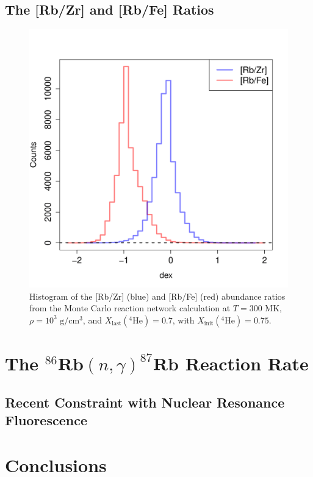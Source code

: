 \subsection{The [Rb/Zr] and [Rb/Fe] Ratios}

\begin{figure}[t]
\centering
\includegraphics[width=6.5in]{Chapter-3/figs/Hist_Ele_Dex_Ratio_RbZr.png}
\caption{\label{fig:RbZr_Hist}Histogram of the [Rb/Zr] (blue) and [Rb/Fe] (red) abundance ratios from the Monte Carlo reaction network calculation at $T = 300$ MK, $\rho = 10^{3}$ $\mathrm{g}/\mathrm{cm}^{3}$, and $X_{\mathrm{last}}(^{4}\mathrm{He}) = 0.7$, with $X_{\mathrm{init}}(^{4}\mathrm{He}) = 0.75.$}
\end{figure}

\section{The $^{86}\mathrm{\textbf{Rb}}(n,\gamma)^{87}\mathrm{\textbf{Rb}}$ Reaction Rate} \label{sec:86Rb_n_g_rate}

\subsection{Recent Constraint with Nuclear Resonance Fluorescence}



\section{Conclusions}

